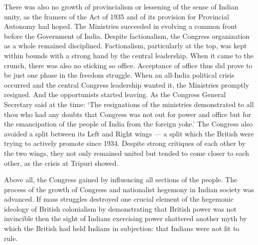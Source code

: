 \begin{multicols}{2}
There was also no growth of provincialism or lessening of the sense of Indian unity, as the framers of the Act of 1935 and of its provision for Provincial Autonomy had hoped. The Ministries succeeded in evolving a common front before the Government of India. Despite factionalism, the Congress organization as a whole remained disciplined. Factionalism, particularly at the top, was kept within bounds with a strong hand by the central leadership. When it came to the crunch, there was also no sticking so office. Acceptance of office thus did prove to be just one phase in the freedom struggle. When an all-India political crisis occurred and the central Congress leadership wanted it, the Ministries promptly resigned. And the opportunists started leaving. As the Congress General Secretary said at the time: `The resignations of the ministries demonstrated to all thou who had any doubts that Congress was not out for power and office but for the emancipation of the people of India from the foreign yoke.' The Congress also avoided a split between its Left and Right wings --- a split which the British were trying to actively promote since 1934. Despite strong critiques of each other by the two wings, they not only remained united but tended to come closer to each other, as the crisis at Tripuri showed.

Above all, the Congress gained by influencing all sections of the people. The process of the growth of Congress and nationalist hegemony in Indian society was advanced. If mass struggles destroyed one crucial element of the hegemonic ideology of British colonialism by demonstrating that British power was not invincible then the sight of Indians exercising power shattered another myth by which the British had held Indians in subjection: that Indians were not fit to rule.
\end{multicols}
